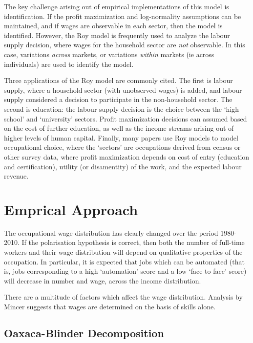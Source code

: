 The key challenge arising out of empirical implementations of this model is identification. If the profit maximization and log-normality assumptions can be maintained, and if wages are observable in each sector, then the model is identified. However, the Roy model is frequently used to analyze the labour supply decision, where wages for the household sector are {\em not} observable. In this case, variations {\em across } markets, or variations {\em within } markets (ie across individuals) are used to identify the model.

Three applications of the Roy model are commonly cited. The first is labour supply, where a household sector (with unobserved wages) is added, and labour supply considered a decision to participate in the non-household sector. The second is education: the labour supply decision is the choice between the `high school' and `university' sectors. Profit maximization decisions can assumed based on the cost of further education, as well as the income streams arising out of higher levels of human capital. Finally, many papers use Roy models to model occupational choice, where the `sectors' are occupations derived from census or other survey data, where profit maximization depends on cost of entry (education and certification), utility (or disamentity) of the work, and the expected labour revenue.

\section{Emprical Approach}
The occupational wage distribution has clearly changed over the period 1980-2010. If the polarisation hypothesis is correct, then both the number of full-time workers and their wage distribution will depend on qualitative properties of the occupation. In particular, it is expected that jobs which can be automated (that is, jobs corresponding to a high `automation' score and a low `face-to-face' score) will decrease in number and wage, across the income distribution.

There are a multitude of factors which affect the wage distribution. Analysis by Mincer suggests that wages are determined on the basis of skills alone.


\subsection{Oaxaca-Blinder Decomposition}

